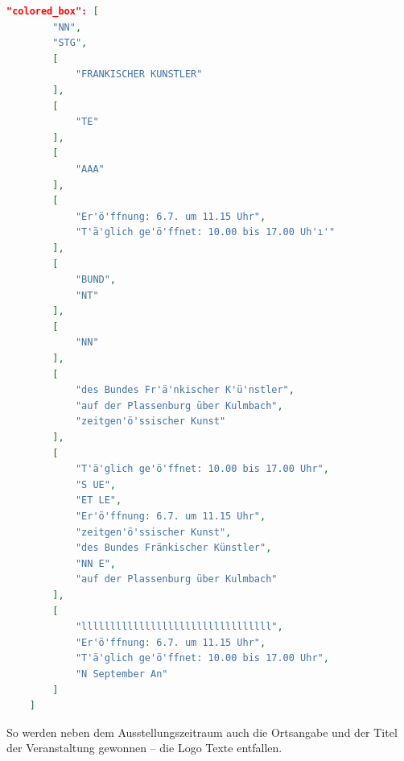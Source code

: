 \documentclass[a4paper,12pt,ngerman]{article}
\begin{document}
\begin{lstlisting}[language=json,escapeinside='']
	"colored_box": [
        "NN",
        "STG",
        [
            "FRANKISCHER KUNSTLER"
        ],
        [
            "TE"
        ],
        [
            "AAA"
        ],
        [
            "Er'ö'ffnung: 6.7. um 11.15 Uhr",
            "T'ä'glich ge'ö'ffnet: 10.00 bis 17.00 Uh'ı'"
        ],
        [
            "BUND",
            "NT"
        ],
        [
            "NN"
        ],
        [
            "des Bundes Fr'ä'nkischer K'ü'nstler",
            "auf der Plassenburg über Kulmbach",
            "zeitgen'ö'ssischer Kunst"
        ],
        [
            "T'ä'glich ge'ö'ffnet: 10.00 bis 17.00 Uhr",
            "S UE",
            "ET LE",
            "Er'ö'ffnung: 6.7. um 11.15 Uhr",
            "zeitgen'ö'ssischer Kunst",
            "des Bundes Fränkischer Künstler",
            "NN E",
            "auf der Plassenburg über Kulmbach"
        ],
        [
            "lllllllllllllllllllllllllllllllll",
            "Er'ö'ffnung: 6.7. um 11.15 Uhr",
            "T'ä'glich ge'ö'ffnet: 10.00 bis 17.00 Uhr",
            "N September An"
        ]
    ]
\end{lstlisting}

So werden neben dem Ausstellungszeitraum auch die Ortsangabe und der Titel der Veranstaltung gewonnen -- die Logo Texte entfallen.\\
\end{document}
